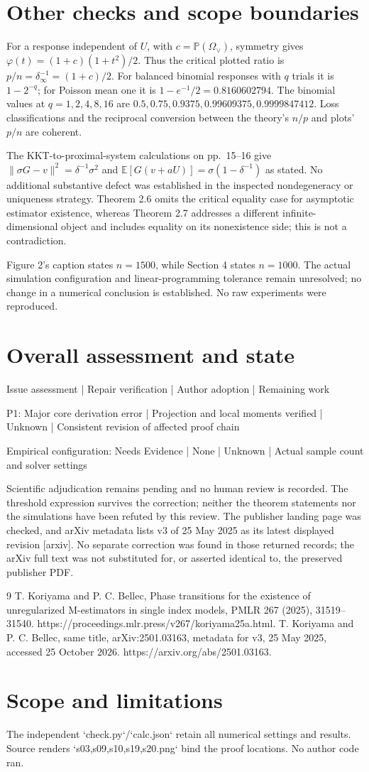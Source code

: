 \documentclass[10pt]{article}
\begin{document}
\section*{Other checks and scope boundaries}
For a response independent of \(U\), with \(c=\mathbb P(\Omega_\vee)\), symmetry gives \(\varphi(t)=(1+c)(1+t^2)/2\). Thus the critical plotted ratio is \(p/n=\delta_\infty^{-1}=(1+c)/2\). For balanced binomial responses with \(q\) trials it is \(1-2^{-q}\); for Poisson mean one it is \(1-e^{-1}/2=0.8160602794\). The binomial values at \(q=1,2,4,8,16\) are \(0.5,0.75,0.9375,0.99609375,0.9999847412\). Loss classifications and the reciprocal conversion between the theory’s \(n/p\) and plots’ \(p/n\) are coherent.\par
The KKT-to-proximal-system calculations on pp. 15–16 give \(\|\sigma G-v\|^2=\delta^{-1}\sigma^2\) and \(\mathbb E[G(v+aU)]=\sigma(1-\delta^{-1})\) as stated. No additional substantive defect was established in the inspected nondegeneracy or uniqueness strategy. Theorem 2.6 omits the critical equality case for asymptotic estimator existence, whereas Theorem 2.7 addresses a different infinite-dimensional object and includes equality on its nonexistence side; this is not a contradiction.\par
Figure 2’s caption states \(n=1500\), while Section 4 states \(n=1000\). The actual simulation configuration and linear-programming tolerance remain unresolved; no change in a numerical conclusion is established. No raw experiments were reproduced.\par
\section*{Overall assessment and state}
Issue assessment | Repair verification | Author adoption | Remaining work\par
P1: Major core derivation error | Projection and local moments verified | Unknown | Consistent revision of affected proof chain\par
Empirical configuration: Needs Evidence | None | Unknown | Actual sample count and solver settings\par
Scientific adjudication remains pending and no human review is recorded. The threshold expression survives the correction; neither the theorem statements nor the simulations have been refuted by this review. The publisher landing page was checked, and arXiv metadata lists v3 of 25 May 2025 as its latest displayed revision [arxiv]. No separate correction was found in those returned records; the arXiv full text was not substituted for, or asserted identical to, the preserved publisher PDF.\par
9 T. Koriyama and P. C. Bellec, Phase transitions for the existence of unregularized M-estimators in single index models, PMLR 267 (2025), 31519–31540. https://proceedings.mlr.press/v267/koriyama25a.html. T. Koriyama and P. C. Bellec, same title, arXiv:2501.03163, metadata for v3, 25 May 2025, accessed 25 October 2026. https://arxiv.org/abs/2501.03163.\par
\section*{Scope and limitations}
The independent `check.py`/`calc.json` retain all numerical settings and results. Source renders `s03,s09,s10,s19,s20.png` bind the proof locations. No author code ran.\par
\end{document}
